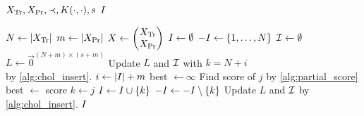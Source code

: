 \begin{algorithmic}[1]
  \REQUIRE \( X_{\text{Tr}}, X_{\text{Pr}}, \prec, K(\cdot, \cdot), s \)
  \ENSURE \( I \)

  \STATE \( N \gets \lvert X_{\text{Tr}}\rvert \)
  \STATE \( m \gets \lvert X_{\text{Pr}}\rvert \)
  \STATE \(
    X \gets
    \begin{pmatrix}
      X_{\text{Tr}} \\
      X_{\text{Pr}}
    \end{pmatrix}
  \)
  \STATE \( I \gets \emptyset \)
  \STATE \( -I \gets \{ 1, \dotsc, N \} \)
  \STATE \( \mathcal{I} \gets \emptyset \)
  \STATE \( L \gets \vec{0}^{(N + m) \times (s + m)} \)
    \STATE Update \( L \) and \( \mathcal{I} \) with
      \( k = N + i \) \\ by \cref{alg:chol_insert}.
  \ENDFOR
    \STATE \( i \gets \lvert I\rvert + m \)
    \STATE best \( \gets \infty \)
      \STATE Find score of \( j \) by \cref{alg:partial_score}
        \STATE best \( \gets \) score
        \STATE \( k \gets j \)
      \ENDIF
    \ENDFOR
    \STATE \( I \gets I \cup \{ k \} \)
    \STATE \( -I \gets -I \setminus \{ k \} \)
    \STATE Update \( L \) and \( \mathcal{I} \) by \cref{alg:chol_insert}.
  \ENDWHILE
  \RETURN \( I \)
\end{algorithmic}
